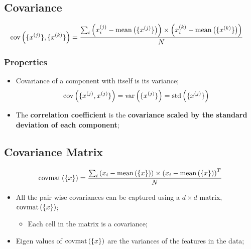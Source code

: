   \subsection{Covariance}
  
    \begin{align}
      \operatorname{cov}\left( \{ x^{(j)} \}, \{ x^{(k)} \} \right) &= \frac{ \sum_{i} \left( x_{i}^{(j)} - \operatorname{mean}\left( \{ x^{(j)} \} \right) \right) \times \left( x_{i}^{(k)} - \operatorname{mean}\left( \{ x^{(k)} \} \right) \right) }{ N }
    \end{align}
    
    \subsubsection{Properties}
    
      \begin{itemize}
        \item Covariance of a component with itself is its variance;
        \begin{equation}
          \operatorname{cov}\left( \{ x^{(j)}, x^{(j)} \} \right) = \operatorname{var}\left( \{ x^{(j)} \} \right) = \operatorname{std}\left( \{ x^{(j)} \} \right)
        \end{equation}
        
        \item The \textbf{correlation coefficient} is the \textbf{covariance scaled by the standard deviation of each component};
      \end{itemize}
      
  \subsection{Covariance Matrix}
  
    \begin{equation}
      \operatorname{covmat}\left( \{ x \} \right) = \frac{ \sum_{i} \left( x_{i} - \operatorname{mean}\left( \{ x \} \right) \right) \times \left( x_{i} - \operatorname{mean}\left( \{ x \} \right) \right)^{T} }{ N }
    \end{equation}
    
    \begin{itemize}
      \item All the pair wise covariances can be captured using a $ d \times d $ matrix, $ \operatorname{covmat}\left( \{ x \} \right) $;
      \begin{itemize}
        \item Each cell in the matrix is a covariance;
      \end{itemize}
      
      \item Eigen values of $ \operatorname{covmat}\left( \{ x \} \right) $ are the variances of the features in the data;
    \end{itemize}
    
